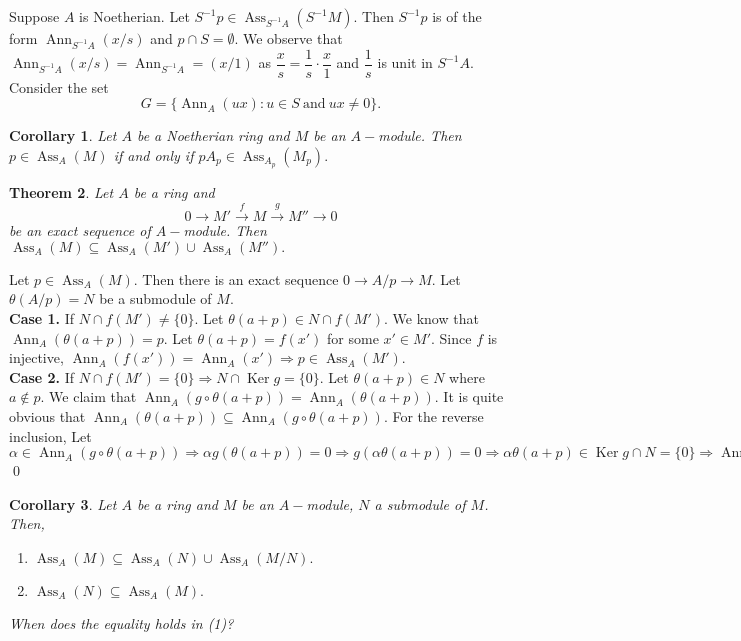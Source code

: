 \documentclass[11pt]{amsart}
\newtheorem{theorem}{Theorem}[section]
\newtheorem{corollary}[theorem]{Corollary}%
\DeclareMathOperator{\ann}{\text{Ann}}
\DeclareMathOperator{\ass}{\text{Ass}}
\DeclareMathOperator{\Ker}{\text{Ker}}
\begin{document}
 Suppose $A$ is Noetherian. Let $S^{-1}p\in\ass_{S^{-1}A}(S^{-1}M)$. Then $S^{-1}p$ is of the form $\ann_{S^{-1}A}(x/s)$ and $p\cap S=\emptyset.$ We observe that $\ann_{S^{-1}A}(x/s)=\ann_{S^{-1}A}=(x/1)$ as $\dfrac{x}{s}=\dfrac{1}{s}\cdot\dfrac{x}{1}$ and $\dfrac{1}{s}$ is unit in $S^{-1}A.$ Consider the set $$G=\{\ann_A(ux):u\in S~\text{and}~ux\neq 0\}.$$












\begin{corollary}

Let $A$ be a Noetherian ring and $M$ be an $A-$module. Then $p\in \ass_A(M)$ if and only if $pA_p\in\ass_{A_p}(M_p).$

\end{corollary}

\begin{theorem}

Let $A$ be a ring and $$0\to M'\xrightarrow{f} M\xrightarrow{g} M''\to 0$$ be an exact sequence of $A-$module. Then $\ass_A(M)\subseteq \ass_A(M')\cup \ass_A(M'').$

\end{theorem}

\proof Let $p\in \ass_A(M).$ Then there is an exact sequence $0\to A/p\to M$. Let $\theta(A/p)=N$ be a submodule of $M.$ \\
\textbf{Case 1.} If $N\cap f(M')\neq \{0\}.$ Let $\theta(a+p)\in N\cap f(M').$ We know that $\ann_A(\theta(a+p))=p.$ Let $\theta(a+p)=f(x')$ for some $x'\in M'.$ Since $f$ is injective, $\ann_A(f(x'))=\ann_A(x')\Rightarrow p\in \ass_A(M').$\\
\textbf{Case 2.} If $N\cap f(M')=\{0\} \Rightarrow N\cap \Ker g=\{0\}.$ Let $\theta(a+p)\in N$ where $a\notin p.$ We claim that $\ann_A(g\circ \theta(a+p))=\ann_A(\theta(a+p)).$ It is quite obvious that $\ann_A(\theta(a+p))\subseteq \ann_A(g\circ\theta(a+p)).$ For the reverse inclusion, Let $\alpha\in \ann_A(g\circ\theta(a+p)) \Rightarrow \alpha g(\theta(a+p))=0 \Rightarrow g(\alpha \theta(a+p))=0 \Rightarrow \alpha\theta(a+p)\in \Ker g\cap N=\{0\} \Rightarrow \ann_A(\theta(a+p)).$ \qed

\begin{corollary}

Let $A$ be a ring and $M$ be an $A-$module, $N$ a submodule of $M$. Then, \begin{enumerate}

\item $\ass_A(M)\subseteq \ass_A(N)\cup \ass_A(M/N).$

\item $\ass_A(N)\subseteq \ass_A(M).$

\end{enumerate}

When does the equality holds in (1)?

\end{corollary}
\end{document}

